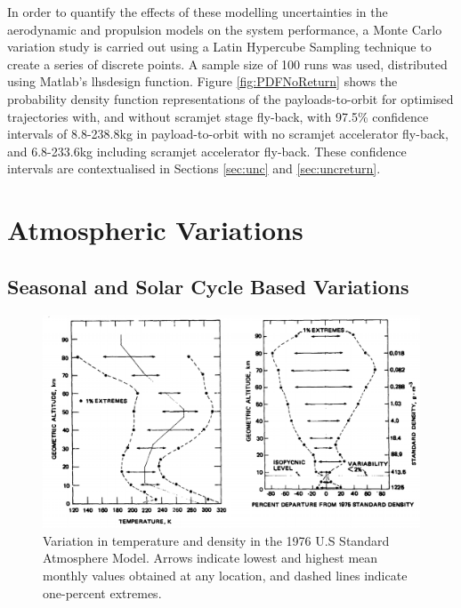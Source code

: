 In order to quantify the effects of these modelling uncertainties in the aerodynamic and propulsion models on the system performance, a Monte Carlo variation study is carried out using a Latin Hypercube Sampling technique to create a series of discrete points. A sample size of 100 runs was used, distributed using Matlab's \textsf{lhsdesign} function. Figure \ref{fig:PDFNoReturn} shows the probability density function representations of the payloads-to-orbit for optimised trajectories with, and without scramjet stage fly-back, with 97.5\% confidence intervals of 8.8-238.8kg in payload-to-orbit with no scramjet accelerator fly-back, and 6.8-233.6kg including scramjet accelerator fly-back. These confidence intervals are contextualised in Sections \ref{sec:unc} and \ref{sec:uncreturn}.



\section{Atmospheric Variations}\label{sec:atmosunc}
\subsection{Seasonal and Solar Cycle Based Variations}

\begin{figure}[ht]
	\centering
	\includegraphics[width=0.8\linewidth]{figures/A1_uncertainty-analysis/AtmosphericVariation}
	\caption{Variation in temperature and density in the 1976 U.S Standard Atmosphere Model\cite{Administration1976}. Arrows indicate lowest and highest mean monthly values obtained at any location, and dashed lines indicate one-percent extremes.}
	\label{fig:AtmosphericVariation}
\end{figure}

